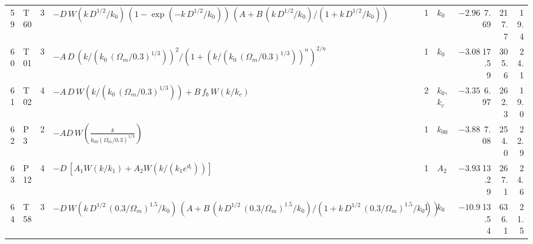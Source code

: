\begin{longtable}{r l r p{} r l r r r r}
59 & T60 & 3 & $-D\,W(k\,D^{1/2}/k_{0})\,(1-\exp(-k\,D^{1/2}/k_{0}))\,(A+B\,(k\,D^{1/2}/k_{0})/(1+k\,D^{1/2}/k_{0}))$ & 1 & $k_0$ & $-2.96$ & 7.69 & 217.7 & 19.4 \\
60 & T01 & 3 & $-A\,D\,(k/(k_{0}\,(\Omega_m/0.3)^{1/3}))^{2}/(1+(k/(k_{0}\,(\Omega_m/0.3)^{1/3}))^{n})^{2/n}$ & 1 & $k_0$ & $-3.08$ & 17.59 & 305.6 & 24.1 \\
61 & T02 & 4 & $-A\,D\,W(k/(k_{0}\,(\Omega_m/0.3)^{1/3}))+B\,f_b\,W(k/k_{c})$ & 2 & $k_0$, $k_c$ & $-3.35$ & 6.97 & 262.3 & 19.0 \\
62 & P3 & 2 & $-AD\,W\!\left(\frac{k}{k_{00}(\Omega_m/0.3)^{1/3}}\right)$ & 1 & $k_{00}$ & $-3.88$ & 7.08 & 254.0 & 22.9 \\
63 & P12 & 4 & $-D\,[A_1W(k/k_1)+A_2W(k/(k_1e^{d_l}))]$ & 1 & $A_2$ & $-3.93$ & 13.29 & 267.1 & 24.6 \\
64 & T58 & 3 & $-D\,W(k\,D^{1/2}\,(0.3/\Omega_m)^{1.5}/k_{0})\,(A+B\,(k\,D^{1/2}\,(0.3/\Omega_m)^{1.5}/k_{0})/(1+k\,D^{1/2}\,(0.3/\Omega_m)^{1.5}/k_{0}))$ & 1 & $k_0$ & $-10.90$ & 13.54 & 636.1 & 21.5 \\
\end{longtable}
\endgroup
